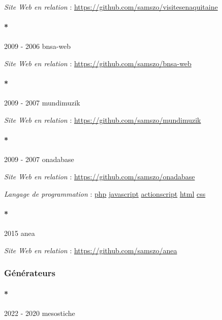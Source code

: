 \documentclass[
  a4paper,
  DIV=11,
  numbers=noendperiod]{scrreprt}
\let\oldparagraph\paragraph
\renewcommand{\paragraph}[1]{\oldparagraph{#1}\mbox{}}
\begin{document}
\emph{Site Web en relation} :
\url{https://github.com/samszo/visitesenaquitaine}

\paragraph*{2009 - 2006 bnsa-web}\label{sec-item301795}

\emph{Site Web en relation} : \url{https://github.com/samszo/bnsa-web}

\paragraph*{2009 - 2007 mundimuzik}\label{sec-item301792}

\emph{Site Web en relation} : \url{https://github.com/samszo/mundimuzik}

\paragraph*{2009 - 2007 onadabase}\label{sec-item301800}

\emph{Site Web en relation} : \url{https://github.com/samszo/onadabase}

\emph{Langage de programmation} :
\href{http://localhost/samszo/omk/s/fiches/item/108369}{php}
\href{http://localhost/samszo/omk/s/fiches/item/89711}{javascript}
\href{http://localhost/samszo/omk/s/fiches/item/158736}{actionscript}
\href{http://localhost/samszo/omk/s/fiches/item/96621}{html}
\href{http://localhost/samszo/omk/s/fiches/item/102418}{css}

\paragraph*{2015 anea}\label{sec-item301797}

\emph{Site Web en relation} : \url{https://github.com/samszo/anea}

\subsubsection{Générateurs}\label{sec-item301734}

\paragraph*{2022 - 2020 mesostiche}\label{sec-item299739}
\end{document}
